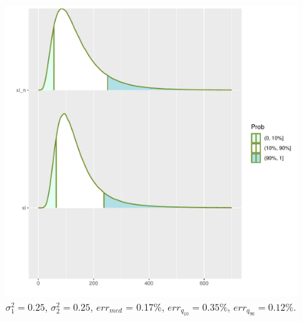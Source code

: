 \documentclass[12pt]{article}
\begin{document}
	\begin{figure}[!hhh]
		\begin{center}
			\begin{minipage}[h]{0.95\linewidth}
				\includegraphics[width=1\linewidth]{img/sr1.pdf}
				\caption{$\sigma_{1}^{2} = 0.25$, $\sigma_{2}^{2} = 0.25$, $err_{med}$ = 0.17\%,  $err_{q_{10}} = 0.35\%$,  $err_{q_{90}} = 0.12\%$. } %
				\label{ris5} %
			\end{minipage}
			
		\end{center}
	\end{figure}
\end{document}
